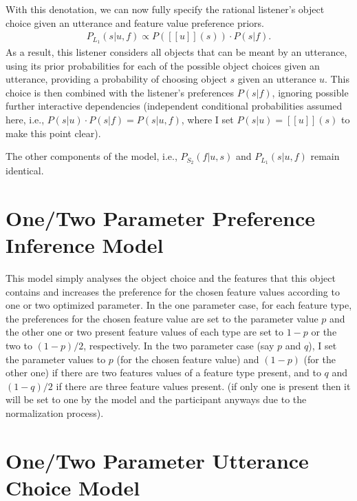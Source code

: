 \documentclass[10pt,a4paper]{article}
\begin{document}
With this denotation, we can now fully specify the rational listener's object choice given an utterance and feature value preference priors.   
\begin{gather}
P_{L_{1}}(s|u,f) \propto P([[u]](s)) \cdot P(s|f).
\end{gather}
As a result, this listener considers all objects that can be meant by an utterance, using its prior probabilities for each of the possible object choices given an utterance, providing a probability of choosing object $s$ given an utterance $u$. 
This choice is then combined with the listener's preferences $P(s|f)$, ignoring possible further interactive dependencies (independent conditional probabilities assumed here, i.e., $P(s|u) \cdot P(s|f) = P(s|u,f)$, where I set $P(s|u)=[[u]](s)$ to make this point clear). 


The other components of the model, i.e., $P_{S_{2}}(f|u,s)$ and $P_{L_{1}}(s|u,f)$ remain identical. 


\section{One/Two Parameter Preference Inference Model}
This model simply analyses the object choice and the features that this object contains and increases the 
preference for the chosen feature values according to one or two optimized parameter.
In the one parameter case, for each feature type, the preferences for the chosen feature value are set to the parameter value $p$ and the other one or two present feature values of each type are set to $1-p$ or the two to $(1-p)/2$, respectively.
In the two parameter case (say $p$ and $q$), I set the parameter values to $p$ (for the chosen feature value) and $(1-p)$ (for the other one) if there are two features values of a feature type present, and to $q$ and $(1-q)/2$ if there are three feature values present. (if only one is present then it will be set to one by the model and the participant anyways due to the normalization process).



\section{One/Two Parameter Utterance Choice Model}




\setlength{\bibleftmargin}{.125in}
\setlength{\bibindent}{-\bibleftmargin}


\end{document}
